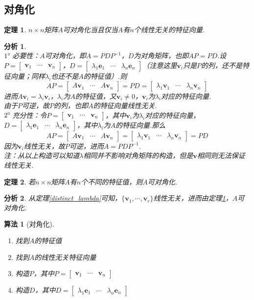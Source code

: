 \documentclass[11pt,UTF8]{ctexart}
\newtheorem{theorem}{定理}
\newtheorem{algorithm}{算法}
\newtheorem*{analysis}{分析}
\newcommand{\vb}[1]{\mathbf{#1}}
\newcommand{\bmat}[2]{\begin{bmatrix}{#1}&\cdots&{#2}\end{bmatrix}}
\begin{document}
\subsection{对角化}
\begin{theorem}
\label{diagonal_iff}
$n\times n$矩阵$A$可对角化当且仅当$A$有$n$个线性无关的特征向量.
\end{theorem}
\begin{analysis}\mbox{}\\
$1\degree\,$必要性：$A$可对角化，即$A=PDP^{-1}$，$D$为对角矩阵，也即$AP=PD$.设$P=\bmat{\vb{v}_1}{\vb{v}_n}$，$D=\bmat{\lambda_1\vb{e}_1}{\lambda_n\vb{e}_n}$（注意这里$\vb{v}_i$只是$P$的列，还不是特征向量；同样$\lambda_i$也还不是$A$的特征值）.则
\[AP=\bmat{A\vb{v}_1}{A\vb{v}_n}=PD=\bmat{\lambda_1\vb{v}_1}{\lambda_n\vb{v}_n}\]
进而$A\vb{v}_i=\lambda_i\vb{v}_i$，$\lambda_i$为$A$的特征值，又$\vb{v}_i\ne 0$，$\vb{v}_i$为$\lambda_i$对应的特征向量.\\
由于$P$可逆，故$P$的列，也即$A$的特征向量线性无关.\\
$2\degree\,$充分性：令$P=\bmat{\vb{v}_1}{\vb{v}_n}$，其中$\vb{v}_i$为$\lambda_i$对应的特征向量，$D=\bmat{\lambda_1\vb{e}_1}{\lambda_n\vb{e}_n}$，其中$\lambda_i$为$A$的特征向量.那么\\
\[AP=\bmat{A\vb{v}_1}{A\vb{v}_n}=\bmat{\lambda_1\vb{v}_1}{\lambda_n\vb{v}_n}=PD\]
因为$\vb{v}_i$线性无关，故$P$可逆，进而$A=PDP^{-1}$.\\
注：从以上构造可以知道$\lambda$相同并不影响对角矩阵的构造，但是$\vb{v}$相同则无法保证线性无关.
\end{analysis}
\begin{theorem}
若$n\times n$矩阵$A$有$n$个不同的特征值，则$A$可对角化.
\end{theorem}
\begin{analysis}
从定理\ref{distinct_lambda}可知，$\{\mathbf{v}_1,\cdots,\mathbf{v}_r\}$线性无关，进而由定理\ref{diagonal_iff}，$A$可对角化.
\end{analysis}
\begin{algorithm}[对角化]\mbox{}\par
\begin{enumerate}
	\itemsep -3pt
	\item 找到$A$的特征值
	\item 找到$A$的线性无关特征向量
	\item 构造$P$，其中$P=\bmat{\mathbf{v}_1}{\mathbf{v}_n}$
	\item 构造$D$，其中$D=\bmat{\lambda_1\mathbf{e}_1}{\lambda_n\mathbf{e}_n}$
\end{enumerate}
\end{algorithm}
\end{document}
